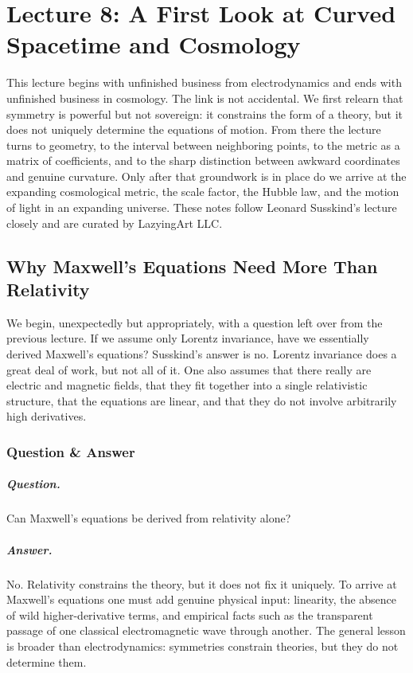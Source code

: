 \chapter{Lecture 8: A First Look at Curved Spacetime and Cosmology}

This lecture begins with unfinished business from electrodynamics and ends with unfinished business in cosmology. The link is not accidental. We first relearn that symmetry is powerful but not sovereign: it constrains the form of a theory, but it does not uniquely determine the equations of motion. From there the lecture turns to geometry, to the interval between neighboring points, to the metric as a matrix of coefficients, and to the sharp distinction between awkward coordinates and genuine curvature. Only after that groundwork is in place do we arrive at the expanding cosmological metric, the scale factor, the Hubble law, and the motion of light in an expanding universe. These notes follow Leonard Susskind's lecture closely and are curated by LazyingArt LLC.

\section{Why Maxwell's Equations Need More Than Relativity}

We begin, unexpectedly but appropriately, with a question left over from the previous lecture. If we assume only Lorentz invariance, have we essentially derived Maxwell's equations? Susskind's answer is no. Lorentz invariance does a great deal of work, but not all of it. One also assumes that there really are electric and magnetic fields, that they fit together into a single relativistic structure, that the equations are linear, and that they do not involve arbitrarily high derivatives.

\subsection{Question \& Answer}

\paragraph{Question.} Can Maxwell's equations be derived from relativity alone?

\paragraph{Answer.} No. Relativity constrains the theory, but it does not fix it uniquely. To arrive at Maxwell's equations one must add genuine physical input: linearity, the absence of wild higher-derivative terms, and empirical facts such as the transparent passage of one classical electromagnetic wave through another. The general lesson is broader than electrodynamics: symmetries constrain theories, but they do not determine them.

